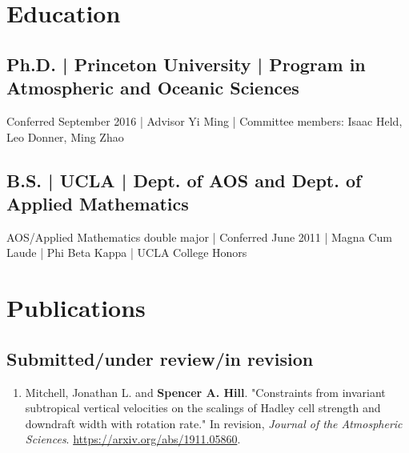 \documentclass[12pt,letterpaper]{shillcv}
\begin{document}
\section*{Education}
\label{sec:org6fcbc82}
\subsection*{Ph.D. | Princeton University | Program in Atmospheric and Oceanic Sciences}
\label{sec:org4491f30}
Conferred September 2016 | Advisor Yi Ming | Committee members: Isaac
Held, Leo Donner, Ming Zhao
\subsection*{B.S. | UCLA | Dept. of AOS and Dept. of Applied Mathematics}
\label{sec:org55f389f}
AOS/Applied Mathematics double major | Conferred June 2011 |
Magna Cum Laude | Phi Beta Kappa | UCLA College Honors
\section*{Publications}
\label{sec:org3534771}
\subsection*{Submitted/under review/in revision}
\label{sec:orge35c7f7}
\begin{enumerate}
\item Mitchell, Jonathan L. and \textbf{Spencer A. Hill}.  "Constraints from invariant
subtropical vertical velocities on the scalings of Hadley cell strength and
downdraft width with rotation rate."  In revision, \emph{Journal of the Atmospheric
Sciences}.  \url{https://arxiv.org/abs/1911.05860}.
\end{enumerate}
\end{document}
